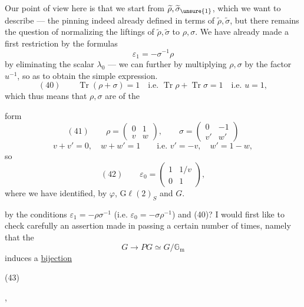 
Our point of view here is that we start from $\widetilde\rho,\widetilde\sigma_{\unsure{1}}$, which we want to describe --- the pinning  indeed already defined in terms of $\widetilde\rho,\widetilde\sigma$, but there remains the question of normalizing the liftings of $\widetilde\rho,\widetilde\sigma$ to $\rho,\sigma$. We have already made a first restriction by the formulas
\[
\varepsilon_1=-\sigma^{-1}\rho
\]
by eliminating the scalar  $\lambda_0$ --- we can  further by multiplying $\rho,\sigma$ by the factor $u^{-1}$, so as to obtain the simple expression.
\[
(40)\qquad\operatorname{Tr}(\rho+\sigma)=1\quad\text{i.e. }\operatorname{Tr}\rho+\operatorname{Tr}\sigma=1\quad\text{i.e. }u=1,
\]
which thus means that $\rho,\sigma$ are of the



form
\[
(41)\qquad \rho=\begin{pmatrix}0&1\\v&w\end{pmatrix},\qquad
\sigma=\begin{pmatrix}0&-1\\v'&w'\end{pmatrix}
\]
\[
v+v'=0,\quad w+w'=1\qquad\text{i.e. }v'=-v,\quad w'=1-w,
\]
so
\[
(42)\qquad\varepsilon_0=\begin{pmatrix}1&1/v\\0&1\end{pmatrix},
\]
where we have identified, by $\varphi$, $\mathrm{G}\ell(2)_S$ and $G$.

 by the conditions $\varepsilon_1=-\rho\sigma^{-1}$ (i.e. $\varepsilon_0=-\sigma\rho^{-1}$) and (40)?
I would first like to check carefully an assertion made in passing a certain number of times, namely that the  
\[
G\longrightarrow PG\simeq G/\mathbb G_{\mathrm m}
\]
induces a \uline{bijection}

\begin{samepage}
(43)\quad
{}
\end{samepage},

